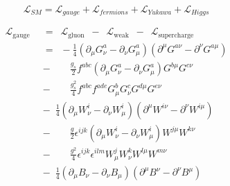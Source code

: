 \documentclass{article}
\let\cal\mathcal
\begin{document}

\[
{\cal L}_{SM}
=
{\cal L}_{gauge}
+
{\cal L}_{fermions}
+
{\cal L}_{Yukawa}
+
{\cal L}_{Higgs}
\]

\begin{align*}
\mathcal{L}_{\text{gauge}}
\enspace &= \enspace 								%
\mathcal{L}_{\text{gluon}}			 				%
\enspace - \enspace									%
\mathcal{L}_{\text{weak}}							%
\enspace - \enspace 								%
\mathcal{L}_{\text{supercharge}} \\					%
\enspace &= \enspace								%
-\frac{1}{4}(\partial_\mu G_\nu^a - \partial_\nu G_\mu^a)(\partial^\mu G^{a\nu} - \partial^\nu G^{a\mu}) \\
&- \qquad 											%
\frac{g_s}{2} f^{abc} (\partial_\mu G_\nu^a - \partial_\nu G_\mu^a) G^{b\mu} G^{c\nu} \\
&- \qquad											%
\frac{g_s^2}{4} f^{abc} f^{ade} G_\mu^b G_\nu^c G^{d\mu} G^{e\nu} \\
&- \enspace											%
\frac{1}{4}(\partial_\mu W_\nu^i - \partial_\nu W_\mu^i)(\partial^\mu W^{i\nu} - \partial^\nu W^{i\mu}) \\
&- \qquad											%
\frac{g}{2} \epsilon^{ijk} (\partial_\mu W_\nu^i - \partial_\nu W_\mu^i) W^{j\mu} W^{k\nu} \\
&- \qquad											%
\frac{g^2}{4} \epsilon^{ijk} \epsilon^{ilm} W_\mu^j W_\nu^k W^{l\mu} W^{m\nu} \\
&- \enspace											%
\frac{1}{4}(\partial_\mu B_\nu - \partial_\nu B_\mu)(\partial^\mu B^\nu - \partial^\nu B^\mu)
\end{align*}

\end{document}
